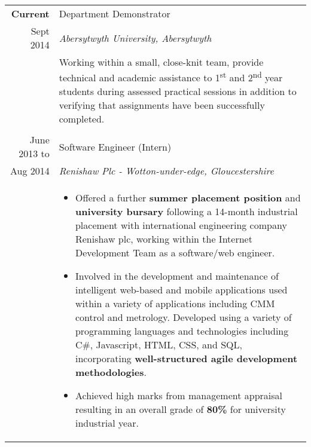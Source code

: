 \documentclass[a4paper, 10pt]{extarticle} %
\begin{document}
\begin{longtable}{r | p{13cm}}

			\textbf{Current}
		
		 & 
		 
		 Department Demonstrator  \\
		 
			Sept 2014
		& 
		
		\textit{Abersytwyth University, Abersytwyth} \\ 
		
& 

\footnotesize{Working within a small, close-knit team, provide technical and academic assistance to 1\textsuperscript{st} and 2\textsuperscript{nd} year students during assessed practical sessions in addition to verifying that assignments have been successfully completed.} \\

\multicolumn{2}{c}{} \\

			June 2013 to
		
		 & 
		 
		 Software Engineer (Intern)  \\
		 
			Aug 2014
		 
		& 
		 
		\textit{Renishaw Plc - Wotton-under-edge, Gloucestershire} \\ 
		
& 

\footnotesize{

\vspace{-0.3cm}

\begin{itemize}[leftmargin=*]
\item Offered a further \textbf{summer placement position} and \textbf{university bursary} following a 14-month industrial placement with international engineering company Renishaw plc, working within the Internet Development Team as a software/web engineer. 

\item Involved in the development and maintenance of intelligent web-based and mobile applications used within a variety of applications including CMM control and metrology. Developed using a variety of programming languages and technologies including C\#, Javascript, HTML, CSS, and SQL, incorporating \textbf{well-structured agile development methodologies}.

\item Achieved high marks from management appraisal resulting in an overall grade of \textbf{80\%} for university industrial year. 


\end{itemize}}
\end{longtable}
\end{document}
